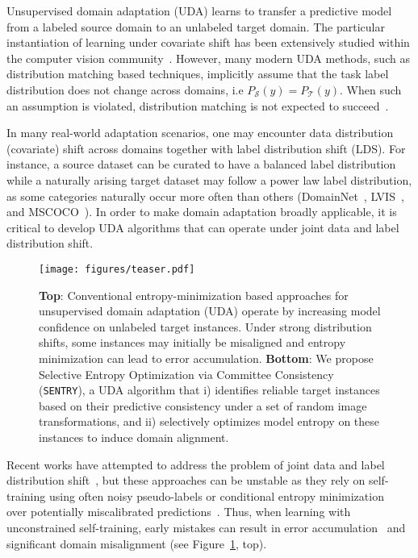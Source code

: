 \documentclass[10pt,twocolumn,letterpaper]{article}
\newcommand{\method}{\texttt{SENTRY}\xspace}
\begin{document}
Unsupervised domain adaptation (UDA) learns to transfer a predictive model from a labeled source domain to an unlabeled target domain. The particular instantiation of learning under covariate shift has been extensively studied within the computer vision community~\cite{ganin2014unsupervised,hoffman2017cycada,long2015learning,saenko2010adapting,tzeng2017adversarial,tzeng2014deep}.
However, many modern UDA methods, such as distribution matching based techniques,
implicitly assume that the task label distribution does not change across domains, i.e $P_\mathcal{S}(y) = P_\mathcal{T}(y)$. When such an assumption is violated, distribution matching is not expected to succeed~\cite{li2020rethinking,wu2019domain}.
   
In many real-world adaptation scenarios, one may encounter data distribution (\ie covariate) shift across domains together with label distribution shift (LDS). For instance, a source dataset can be curated to have a balanced label distribution while a naturally arising target dataset may follow a power law label distribution, as some categories naturally occur more often than others (\eg DomainNet~\cite{peng2019moment}, LVIS~\cite{gupta2019lvis}, and MSCOCO~\cite{lin2014microsoft}). In order to make domain adaptation broadly applicable, it is critical to develop UDA algorithms that can operate under joint data and label distribution shift.
   
\begin{figure}[t]
   \centering
    \vspace{-10pt}
   \noindent\texttt{[image: figures/teaser.pdf]}
   \caption{
   \textbf{Top}: Conventional entropy-minimization based approaches for unsupervised domain adaptation (UDA) operate by increasing model confidence on unlabeled target instances. Under strong distribution shifts, some instances may initially be misaligned and entropy minimization can lead to error accumulation. \textbf{Bottom}: We propose Selective Entropy Optimization via Committee Consistency (\method), a UDA algorithm that i) identifies reliable target instances based on their predictive consistency under a set of random image transformations, and ii) selectively optimizes model entropy on these instances to induce domain alignment. }
   \label{fig:teaser}
   \vspace*{-7pt}
\end{figure}


Recent works have attempted to address the problem of joint data and label distribution shift~\cite{li2020rethinking,tan2019generalized}, but these approaches can be unstable as they rely on self-training using often noisy pseudo-labels or conditional entropy minimization~\cite{li2020rethinking} over potentially miscalibrated predictions~\cite{guo2017calibration,snoek2019can}. Thus, when learning with unconstrained self-training, early mistakes can result in error accumulation~\cite{chen2019progressive} and significant domain misalignment (see Figure~\ref{fig:teaser}, top).
   
\end{document}
